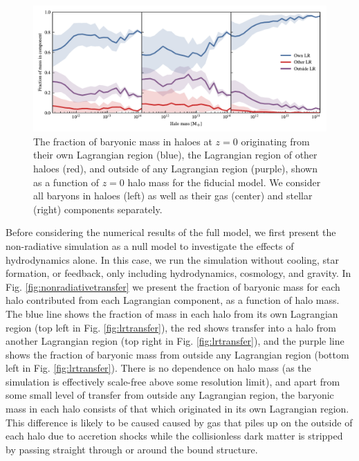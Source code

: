 \begin{figure}
	\centering
	\includegraphics{figures/s50j7kAHF/component_fraction_mixed.pdf}
	\vspace{-0.7cm}
	\caption{
  The fraction of baryonic mass in haloes at $z=0$ originating from their own
  Lagrangian region (blue), the Lagrangian region of other haloes (red), and
  outside of any Lagrangian region (purple), shown as a function of $z=0$
  halo mass for the fiducial \simba{} model. We consider all baryons in
  haloes (left) as well as their gas (center) and stellar (right) components
  separately.
	}
	\label{fig:maintransferresult}
\end{figure}

Before considering the numerical results of the full model, we first present
the non-radiative simulation as a null model to investigate the effects of
hydrodynamics alone. In this case, we run the simulation without cooling,
star formation, or feedback, only including hydrodynamics, cosmology, and
gravity. In Fig. \ref{fig:nonradiativetransfer} we present the fraction of
baryonic mass for each halo contributed from each Lagrangian component, as a
function of halo mass. The blue line shows the fraction of mass in each halo
from its own Lagrangian region (top left in Fig. \ref{fig:lrtransfer}), the
red shows transfer into a halo from another Lagrangian region (top right in
Fig. \ref{fig:lrtransfer}), and the purple line shows the fraction of
baryonic mass from outside any Lagrangian region (bottom left in Fig.
\ref{fig:lrtransfer}). There is no dependence on halo mass (as the simulation is
effectively scale-free above some resolution limit), and apart from some
small level of transfer from outside any Lagrangian region, the baryonic mass
in each halo consists of that which originated in its own Lagrangian region.
This difference is likely to be caused caused by gas that piles up on the
outside of each halo due to accretion shocks while the collisionless dark
matter is stripped by passing straight through or around the bound structure.

